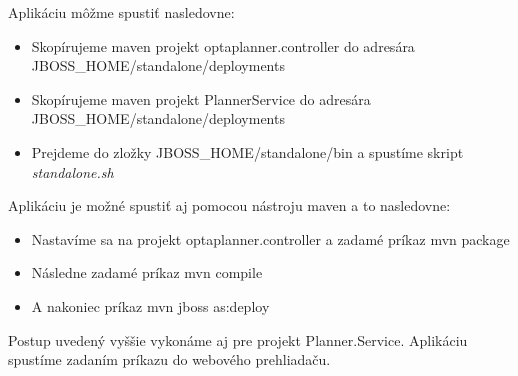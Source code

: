 {	Aplikáciu môžme spustiť nasledovne:
	\begin{itemize}
	\item Skopírujeme maven projekt optaplanner.controller do adresára \\ JBOSS\_HOME/standalone/deployments
	\item Skopírujeme maven projekt PlannerService do adresára \\ JBOSS\_HOME/standalone/deployments
	\item Prejdeme do zložky JBOSS\_HOME/standalone/bin a spustíme skript \emph{standalone.sh}
	\end{itemize}
	Aplikáciu je možné spustiť aj pomocou nástroju maven a to nasledovne:
	\begin{itemize}
	\item Nastavíme sa na projekt optaplanner.controller a zadamé príkaz mvn package
	\item Následne zadamé príkaz mvn compile
	\item A nakoniec príkaz mvn jboss as:deploy
	\end{itemize}
	Postup uvedený vyššie vykonáme aj pre projekt Planner.Service. 
	Aplikáciu spustíme zadaním príkazu  do webového prehliadaču.


}

